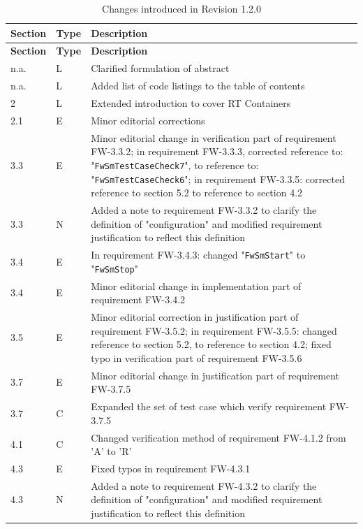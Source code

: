 \documentclass[requirements]{../fwprofile}
\begin{document}
\begin{longtable}{|p{1.5cm}|p{1cm}|p{8cm}|}
\caption{Changes introduced in Revision 1.2.0} \\
\hline
\rowcolor{light-gray}
\textbf{Section} & \textbf{Type} & \textbf{Description} \\
\hline\hline
\endfirsthead
\rowcolor{light-gray}
\textbf{Section} & \textbf{Type} & \textbf{Description} \\
\hline\hline
\endhead
n.a. & L & Clarified formulation of abstract\\
\hline
n.a. & L & Added list of code listings to the table of contents\\
\hline
2 & L & Extended introduction to cover RT Containers \\
\hline
2.1 & E & Minor editorial corrections\\
\hline
3.3 & E & Minor editorial change in verification part of requirement FW-3.3.2; in requirement FW-3.3.3, corrected reference to: "\texttt{FwSmTestCaseCheck7}", to reference to: "\texttt{FwSmTestCaseCheck6}"; in requirement FW-3.3.5: corrected reference to section 5.2 to reference to section 4.2\\
\hline
3.3 & N & Added a note to requirement FW-3.3.2 to clarify the definition of "configuration" and modified requirement justification to reflect this definition \\
\hline
3.4 & E & In requirement FW-3.4.3: changed "\texttt{FwSmStart}" to "\texttt{FwSmStop}"\\
\hline
3.4 & E & Minor editorial change in implementation part of requirement FW-3.4.2 \\
\hline
3.5 & E & Minor editorial correction in justification part of requirement FW-3.5.2; in requirement FW-3.5.5: changed reference to section 5.2, to reference to section 4.2; fixed typo in verification part of requirement FW-3.5.6 \\
\hline
3.7 & E & Minor editorial change in justification part of requirement FW-3.7.5 \\
\hline
3.7 & C & Expanded the set of test case which verify requirement FW-3.7.5 \\
\hline
4.1 & C & Changed verification method of requirement FW-4.1.2 from 'A' to 'R' \\
\hline
4.3 & E & Fixed typos in requirement FW-4.3.1 \\
\hline
4.3 & N & Added a note to requirement FW-4.3.2 to clarify the definition of "configuration" and modified requirement justification to reflect this definition \\

\end{longtable}
\end{document}
